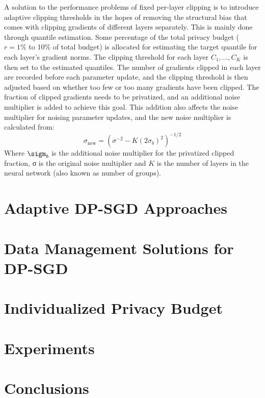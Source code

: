 \documentclass[11pt]{article}
\begin{document}
A solution to the performance problems of fixed per-layer clipping is to introduce adaptive clipping thresholds in the hopes of removing the structural bias that comes with clipping gradients of different layers separately. This is mainly done through quantile estimation. Some percentage of the total privacy budget ($r=1\%$ to 10\% of total budget) is allocated for estimating the target quantile for each layer’s gradient norms. The clipping threshold for each layer $C_1,...,C_K$ is then set to the estimated quantiles. The number of gradients clipped in each layer are recorded before each parameter update, and the clipping threshold is then adjusted based on whether too few or too many gradients have been clipped. The fraction of clipped gradients needs to be privatized, and an additional noise multiplier is added to achieve this goal. This addition also affects the noise multiplier for noising parameter updates, and the new noise multiplier is calculated from:
\[ \sigma_\text{new}=(\sigma^{-2}-K(2\sigma_b)^2)^{-1/2}\]
Where $\sigm_b$ is the additional noise multiplier for the privatized clipped fraction, σ is the original noise multiplier and $K$ is the number of layers in the neural network (also known as number of groups).
\fi

\section{Adaptive DP-SGD Approaches}
\label{sec:adaptation}


\section{Data Management Solutions for DP-SGD}
\label{sec:mgmt}


\section{Individualized Privacy Budget}
\label{sec:individ}


\section{Experiments}
\label{sec:exps}



\section{Conclusions}
\label{sec:conclusions}
\end{document}
